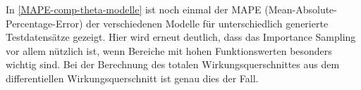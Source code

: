 In \textsf{\autoref{MAPE-comp-theta-modelle}} ist noch einmal der MAPE (Mean-Absolute-Percentage-Error) der verschiedenen Modelle für unterschiedlich generierte Testdatensätze gezeigt. Hier wird erneut deutlich, dass das Importance Sampling vor allem nützlich ist, wenn Bereiche mit hohen Funktionswerten besonders wichtig sind. Bei der Berechnung des totalen Wirkungsquerschnittes aus dem differentiellen Wirkungsquerschnitt ist genau dies der Fall.
\begin{figure}[h]
	\centering
	 \\
	\captionsetup{justification=justified}	

\end{figure}
